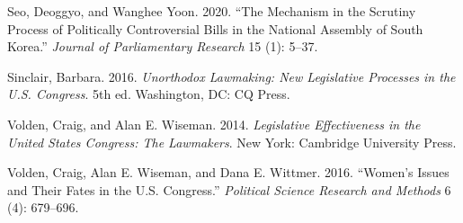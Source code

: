 \documentclass[11pt]{article}
\begin{document}
\begin{description}
\item Seo, Deoggyo, and Wanghee Yoon. 2020. ``The Mechanism in the Scrutiny Process of Politically Controversial Bills in the National Assembly of South Korea.'' \textit{Journal of Parliamentary Research} 15 (1): 5--37.

\item Sinclair, Barbara. 2016. \textit{Unorthodox Lawmaking: New Legislative Processes in the U.S. Congress}. 5th ed. Washington, DC: CQ Press.

\item Volden, Craig, and Alan E. Wiseman. 2014. \textit{Legislative Effectiveness in the United States Congress: The Lawmakers}. New York: Cambridge University Press.

\item Volden, Craig, Alan E. Wiseman, and Dana E. Wittmer. 2016. ``Women's Issues and Their Fates in the U.S. Congress.'' \textit{Political Science Research and Methods} 6 (4): 679--696.

\end{description}
\end{document}
